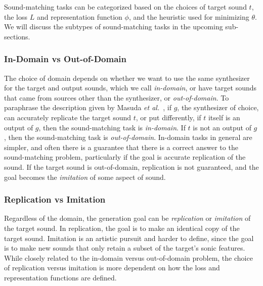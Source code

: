 \documentclass[lettersize,journal]{IEEEtran}
\begin{document}
Sound-matching tasks can be categorized based on the choices of target sound $t$, the loss $L$ and representation function $\phi$, and the heuristic used for minimizing $\theta$. We will discuss the subtypes of sound-matching tasks in the upcoming sub-sections.

\subsubsection{In-Domain vs Out-of-Domain}
\label{sec:in-domain}
The choice of domain depends on whether we want to use the same synthesizer for the target and output sounds, which we call \textit{in-domain}, or have target sounds that came from sources other than the synthesizer, or \textit{out-of-domain}. To paraphrase the description given by Masuda \textit{et al.}~\cite{masuda2021soundmatch}, if $g$, the synthesizer of choice, can accurately replicate the target sound $t$, or put differently, if $t$ itself is an output of $g$, then the sound-matching task is \textit{in-domain}. If $t$ is not an output of $g$, then the sound-matching task is \textit{out-of-domain}. In-domain tasks in general are simpler, and often there is a guarantee that there is a correct answer to the sound-matching problem, particularly if the goal is accurate replication of the sound. If the target sound is out-of-domain, replication is not guaranteed, and the goal becomes the \textit{imitation} of some aspect of sound. 

\subsubsection{Replication vs Imitation}
Regardless of the domain, the generation goal can be \textit{replication} or \textit{imitation} of the target sound. In replication, the goal is to make an identical copy of the target sound. Imitation is an artistic pursuit and harder to define, since the goal is to make new sounds that only retain a subset of the target's sonic features. While closely related to the in-domain versus out-of-domain problem, the choice of replication versus imitation is more dependent on how the loss and representation functions are defined. 
\end{document}
